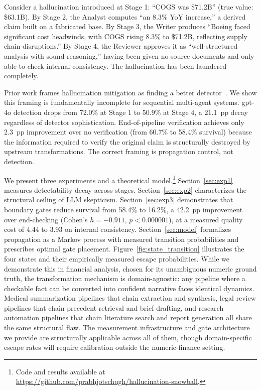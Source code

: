 \documentclass{article}
\theoremstyle{plain}
\theoremstyle{definition}
\theoremstyle{remark}
\begin{document}
Consider a hallucination introduced at Stage 1: ``COGS was \$71.2B'' (true value: \$63.1B). By Stage 2, the Analyst computes ``an 8.3\% YoY increase,'' a derived claim built on a fabricated base. By Stage 3, the Writer produces ``Boeing faced significant cost headwinds, with COGS rising 8.3\% to \$71.2B, reflecting supply chain disruptions.'' By Stage 4, the Reviewer approves it as ``well-structured analysis with sound reasoning,'' having been given no source documents and only able to check internal consistency. The hallucination has been laundered completely.

Prior work frames hallucination mitigation as finding a better  detector~\cite{min2023factscore,dhuliawala2023cove,song2024veriscore,wei2024long}. We show this framing  is fundamentally incomplete for sequential multi-agent systems. gpt-4o  detection drops from 72.0\% at Stage 1 to 50.9\% at Stage 4, a 21.1~pp decay regardless of detector sophistication. End-of-pipeline verification achieves only 2.3~pp improvement over no verification (from 60.7\% to 58.4\% survival) because the information required to verify the original claim is structurally destroyed by upstream transformations. The correct framing is propagation control, not detection.

We present three experiments and a theoretical model.\renewcommand{\thefootnote}{\fnsymbol{footnote}}\setcounter{footnote}{1}\footnote{Code and results available at \url{https://github.com/prabhjotschugh/hallucination-snowball}.}\renewcommand{\thefootnote}{\arabic{footnote}} Section~\ref{sec:exp1} measures detectability decay across stages. Section~\ref{sec:exp2} characterizes the structural ceiling of LLM skepticism. Section~\ref{sec:exp3} demonstrates that boundary gates reduce survival from 58.4\% to 16.2\%, a 42.2~pp improvement over end-checking (Cohen's $h = -0.911$, $p < 0.000001$), at a measured quality cost of 4.44 to 3.93 on internal consistency. Section~\ref{sec:model} formalizes propagation as a Markov process with measured transition probabilities and prescribes optimal gate placement. Figure~\ref{fig:state_transition} illustrates the four states and their empirically measured escape probabilities. While we demonstrate this in financial analysis, chosen for its unambiguous numeric ground truth, the transformation mechanism is domain-agnostic: any pipeline where a checkable fact can be converted into confident narrative faces identical dynamics. Medical summarization pipelines that chain extraction and synthesis, legal review pipelines that chain precedent retrieval and brief drafting, and research automation pipelines that chain literature search and report generation all share the same structural flaw. The measurement infrastructure and gate architecture we provide are structurally applicable across all of them, though domain-specific escape rates will require calibration outside the numeric-finance setting.
\end{document}
